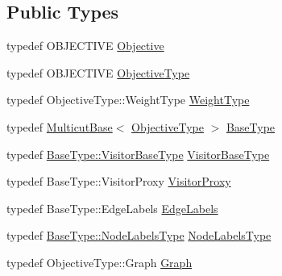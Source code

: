 \subsection*{Public Types}
\begin{DoxyCompactItemize}
\item 
typedef O\+B\+J\+E\+C\+T\+I\+V\+E \hyperlink{classnifty_1_1graph_1_1optimization_1_1multicut_1_1BlockMulticut_a4687a9c2304a995a612e69abc3b1b37f}{Objective}
\item 
typedef O\+B\+J\+E\+C\+T\+I\+V\+E \hyperlink{classnifty_1_1graph_1_1optimization_1_1multicut_1_1BlockMulticut_abaa8f874df71e8fc875ddc3928768f92}{Objective\+Type}
\item 
typedef Objective\+Type\+::\+Weight\+Type \hyperlink{classnifty_1_1graph_1_1optimization_1_1multicut_1_1BlockMulticut_aa5bbe72e3c448275a0a0f8f9bbc48f49}{Weight\+Type}
\item 
typedef \hyperlink{classnifty_1_1graph_1_1optimization_1_1multicut_1_1MulticutBase}{Multicut\+Base}$<$ \hyperlink{classnifty_1_1graph_1_1optimization_1_1multicut_1_1BlockMulticut_abaa8f874df71e8fc875ddc3928768f92}{Objective\+Type} $>$ \hyperlink{classnifty_1_1graph_1_1optimization_1_1multicut_1_1BlockMulticut_a3a962010a87b80c4686f7b6c69e4cd87}{Base\+Type}
\item 
typedef \hyperlink{classnifty_1_1graph_1_1optimization_1_1common_1_1SolverBase_a5a14d64c70a9cc0eebc7d71d2b089f9b}{Base\+Type\+::\+Visitor\+Base\+Type} \hyperlink{classnifty_1_1graph_1_1optimization_1_1multicut_1_1BlockMulticut_a5565253c12963ec0e384ccbaa56f1e5b}{Visitor\+Base\+Type}
\item 
typedef Base\+Type\+::\+Visitor\+Proxy \hyperlink{classnifty_1_1graph_1_1optimization_1_1multicut_1_1BlockMulticut_ae5c617c56143fe71df413d906d027df3}{Visitor\+Proxy}
\item 
typedef Base\+Type\+::\+Edge\+Labels \hyperlink{classnifty_1_1graph_1_1optimization_1_1multicut_1_1BlockMulticut_adbc8b4425b9c6ee28045a6191f385414}{Edge\+Labels}
\item 
typedef \hyperlink{classnifty_1_1graph_1_1optimization_1_1common_1_1SolverBase_a6e4e465f3b6e039882669fcfb9714818}{Base\+Type\+::\+Node\+Labels\+Type} \hyperlink{classnifty_1_1graph_1_1optimization_1_1multicut_1_1BlockMulticut_a8578c7f9e0703298373936d2697043c9}{Node\+Labels\+Type}
\item 
typedef Objective\+Type\+::\+Graph \hyperlink{classnifty_1_1graph_1_1optimization_1_1multicut_1_1BlockMulticut_aa10337744cd85afe7cf6ee27d6310e32}{Graph}
\item 

\end{DoxyCompactItemize}
